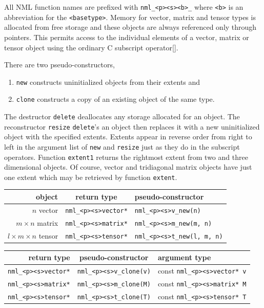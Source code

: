 \documentclass[twoside,12pt]{article}
\begin{document}
All NML function names are prefixed with {\tt nml\_<p><s><b>\_}
where {\tt <b>} is an abbreviation for the {\tt <basetype>}.
Memory for vector, matrix and tensor types is allocated from free storage
and these objects are always referenced only through pointers.
This permits access to the individual elements of a vector, matrix
or tensor object using the ordinary C subscript operator[].

There are two pseudo-constructors,
\begin{enumerate}
\item	{\tt new}   constructs uninitialized objects from their extents and
\item	{\tt clone} constructs a copy of an existing object of the same type.
\end{enumerate}
The destructor {\tt delete} deallocates any storage allocated for an object.
The reconstructor {\tt resize} {\tt delete}'s an object
then replaces it with a new uninitialized object with the specified extents.
Extents appear in reverse order from right to left in the argument list
of {\tt new} and {\tt resize} just as they do in the subscript operators.
Function {\tt extent1} returns the rightmost extent
from two and three dimensional objects.
Of course, vector and tridiagonal matrix objects have just one extent
which may be retrieved by function {\tt extent}.

\begin{center}
\begin{tabular}{r|c|l}
object		&return type
&pseudo-constructor	\\
\hline
		      $n$ vector&{\tt nml\_<p><s>vector*}
&{\tt nml\_<p><s>v\_new(n)} \\
	  $m\!\times\!n$ matrix &{\tt nml\_<p><s>matrix*}
&{\tt nml\_<p><s>m\_new(m, n)} \\
$l\!\times\!m\!\times\!n$ tensor&{\tt nml\_<p><s>tensor*}
&{\tt nml\_<p><s>t\_new(l, m, n)} \\
\end{tabular}
\end{center}

\begin{center}
\begin{tabular}{r|c|l}
return type	&pseudo-constructor	&argument type	\\
\hline
{\tt nml\_<p><s>vector*}&{\tt nml\_<p><s>v\_clone(v)}
&{const \tt nml\_<p><s>vector* v} \\
{\tt nml\_<p><s>matrix*}&{\tt nml\_<p><s>m\_clone(M)}
&{const \tt nml\_<p><s>matrix* M} \\
{\tt nml\_<p><s>tensor*}&{\tt nml\_<p><s>t\_clone(T)}
&{const \tt nml\_<p><s>tensor* T} \\
\end{tabular}
\end{center}
\end{document}
